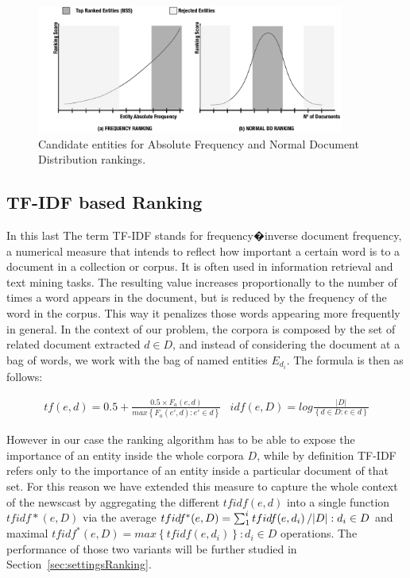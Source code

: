 \documentclass{llncs}
\begin{document}
\begin{figure}[h!]
\centering
\includegraphics[width=0.9\textwidth]{figure/RankingStrategies}
\caption{Candidate entities for Absolute Frequency and Normal Document Distribution rankings.}
\label{fig:rankingStrategies}%
\end{figure}

\subsection{TF-IDF based Ranking}

In this last The term TF-IDF stands for frequency�inverse document frequency, a numerical measure that intends to reflect how important a certain word is to a document in a collection or corpus. It is often used in information retrieval and text mining tasks. The resulting value increases proportionally to the number of times a word appears in the document, but is reduced by the frequency of the word in the corpus. This way it penalizes those words appearing more frequently in general. In the context of our problem, the corpora is composed by the set of related document extracted $d \in D$, and instead of considering the document at a bag of words, we work with the bag of named entities $E_{d_i}$. The formula is then as follows:

\begin{equation}
\begin{matrix}
tf(e,d) = 0.5 + \frac{0.5\times F_{a}(e,d)}{max\left \{ F_{a}(e',d) : e' \in d\right \}}  & idf(e,D) = log\frac{\left | D \right |}{\left \{ d\in D  :  e\in d \right \}}
\end{matrix}
\end{equation}

However in our case the ranking algorithm has to be able to expose the importance of an entity inside the whole corpora $D$, while by definition TF-IDF refers only to the importance of an entity inside a particular document of that set. For this reason we have extended this measure to capture the whole context of the newscast by aggregating the different $tfidf(e,d)$ into a single function $tfidf*(e,D)$ via the average $tfidf^{*}(e,D)=\sum_{1}^{i}tfidf(e,d_{i})\left /| D \right |: d_{i} \in D$ and maximal $tfidf^{*}(e,D)=max \left \{ tfidf(e,d_{i}) \right \} : d_{i} \in D$ operations. The performance of those two variants will be further studied in Section~\ref{sec:settingsRanking}.
\end{document}
